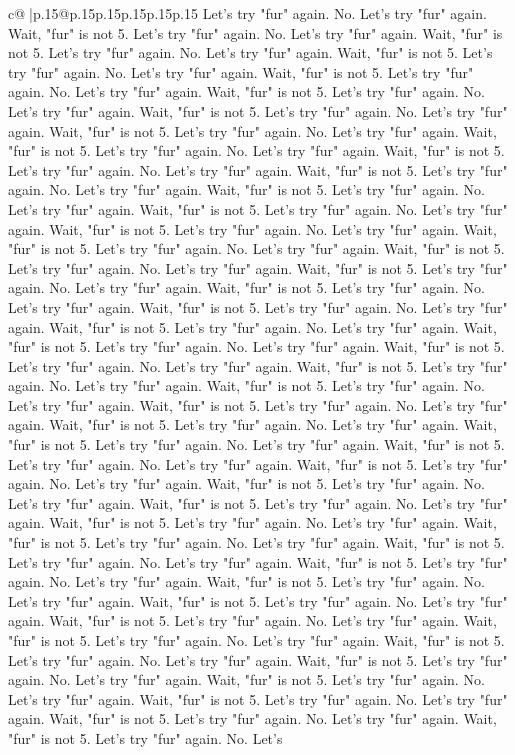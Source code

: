 \documentclass{article}
\begin{document}
{\begin{supertabular}{c@{$\;$}|p{.15\linewidth}@{}p{.15\linewidth}p{.15\linewidth}p{.15\linewidth}p{.15\linewidth}p{.15\linewidth}}
{{{Let's try "fur" again. No. Let's try "fur" again. Wait, "fur" is not 5. Let's try "fur" again. No. Let's try "fur" again. Wait, "fur" is not 5. Let's try "fur" again. No. Let's try "fur" again. Wait, "fur" is not 5. Let's try "fur" again. No. Let's try "fur" again. Wait, "fur" is not 5. Let's try "fur" again. No. Let's try "fur" again. Wait, "fur" is not 5. Let's try "fur" again. No. Let's try "fur" again. Wait, "fur" is not 5. Let's try "fur" again. No. Let's try "fur" again. Wait, "fur" is not 5. Let's try "fur" again. No. Let's try "fur" again. Wait, "fur" is not 5. Let's try "fur" again. No. Let's try "fur" again. Wait, "fur" is not 5. Let's try "fur" again. No. Let's try "fur" again. Wait, "fur" is not 5. Let's try "fur" again. No. Let's try "fur" again. Wait, "fur" is not 5. Let's try "fur" again. No. Let's try "fur" again. Wait, "fur" is not 5. Let's try "fur" again. No. Let's try "fur" again. Wait, "fur" is not 5. Let's try "fur" again. No. Let's try "fur" again. Wait, "fur" is not 5. Let's try "fur" again. No. Let's try "fur" again. Wait, "fur" is not 5. Let's try "fur" again. No. Let's try "fur" again. Wait, "fur" is not 5. Let's try "fur" again. No. Let's try "fur" again. Wait, "fur" is not 5. Let's try "fur" again. No. Let's try "fur" again. Wait, "fur" is not 5. Let's try "fur" again. No. Let's try "fur" again. Wait, "fur" is not 5. Let's try "fur" again. No. Let's try "fur" again. Wait, "fur" is not 5. Let's try "fur" again. No. Let's try "fur" again. Wait, "fur" is not 5. Let's try "fur" again. No. Let's try "fur" again. Wait, "fur" is not 5. Let's try "fur" again. No. Let's try "fur" again. Wait, "fur" is not 5. Let's try "fur" again. No. Let's try "fur" again. Wait, "fur" is not 5. Let's try "fur" again. No. Let's try "fur" again. Wait, "fur" is not 5. Let's try "fur" again. No. Let's try "fur" again. Wait, "fur" is not 5. Let's try "fur" again. No. Let's try "fur" again. Wait, "fur" is not 5. Let's try "fur" again. No. Let's try "fur" again. Wait, "fur" is not 5. Let's try "fur" again. No. Let's try "fur" again. Wait, "fur" is not 5. Let's try "fur" again. No. Let's try "fur" again. Wait, "fur" is not 5. Let's try "fur" again. No. Let's try "fur" again. Wait, "fur" is not 5. Let's try "fur" again. No. Let's try "fur" again. Wait, "fur" is not 5. Let's try "fur" again. No. Let's try "fur" again. Wait, "fur" is not 5. Let's try "fur" again. No. Let's try "fur" again. Wait, "fur" is not 5. Let's try "fur" again. No. Let's try "fur" again. Wait, "fur" is not 5. Let's try "fur" again. No. Let's try "fur" again. Wait, "fur" is not 5. Let's try "fur" again. No. Let's try "fur" again. Wait, "fur" is not 5. Let's try "fur" again. No. Let's try "fur" again. Wait, "fur" is not 5. Let's try "fur" again. No. Let's try "fur" again. Wait, "fur" is not 5. Let's try "fur" again. No. Let's try "fur" again. Wait, "fur" is not 5. Let's try "fur" again. No. Let's try "fur" again. Wait, "fur" is not 5. Let's try "fur" again. No. Let's try "fur" again. Wait, "fur" is not 5. Let's try "fur" again. No. Let's try "fur" again. Wait, "fur" is not 5. Let's try "fur" again. No. Let's try "fur" again. Wait, "fur" is not 5. Let's try "fur" again. No. Let's }}}
\end{supertabular}}
\end{document}
